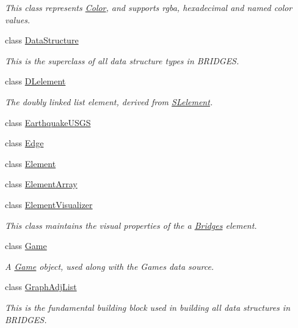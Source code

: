 \begin{DoxyCompactItemize}
\begin{DoxyCompactList}\small\item\em This class represents \hyperlink{classbridges_1_1_color}{Color}, and supports rgba, hexadecimal and named color values. \end{DoxyCompactList}\item 
class \hyperlink{classbridges_1_1_data_structure}{Data\+Structure}
\begin{DoxyCompactList}\small\item\em This is the superclass of all data structure types in B\+R\+I\+D\+G\+ES. \end{DoxyCompactList}\item 
class \hyperlink{classbridges_1_1_d_lelement}{D\+Lelement}
\begin{DoxyCompactList}\small\item\em The doubly linked list element, derived from \hyperlink{classbridges_1_1_s_lelement}{S\+Lelement}. \end{DoxyCompactList}\item 
class \hyperlink{classbridges_1_1_earthquake_u_s_g_s}{Earthquake\+U\+S\+GS}
\item 
class \hyperlink{classbridges_1_1_edge}{Edge}
\item 
class \hyperlink{classbridges_1_1_element}{Element}
\item 
class \hyperlink{classbridges_1_1_element_array}{Element\+Array}
\item 
class \hyperlink{classbridges_1_1_element_visualizer}{Element\+Visualizer}
\begin{DoxyCompactList}\small\item\em This class maintains the visual properties of the a \hyperlink{namespacebridges_1_1_bridges}{Bridges} element. \end{DoxyCompactList}\item 
class \hyperlink{classbridges_1_1_game}{Game}
\begin{DoxyCompactList}\small\item\em A \hyperlink{classbridges_1_1_game}{Game} object, used along with the Games data source. \end{DoxyCompactList}\item 
class \hyperlink{classbridges_1_1_graph_adj_list}{Graph\+Adj\+List}
\begin{DoxyCompactList}\small\item\em This is the fundamental building block used in building all data structures in B\+R\+I\+D\+G\+ES. \end{DoxyCompactList}\item 

\end{DoxyCompactItemize}
